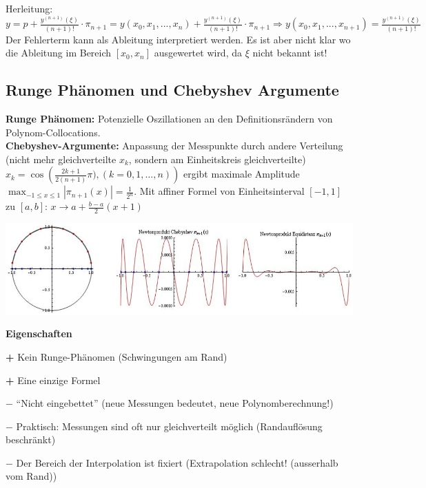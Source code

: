 Herleitung: $y = p + \frac{y^{(n+1)}(\xi)}{(n+1)!} \cdot \pi_{n+1} = y(x_0,x_1,...,x_n) + \frac{y^{(n+1)}(\xi)}{(n+1)!} \cdot \pi_{n+1} \Longrightarrow y(x_0,x_1,...,x_{n+1}) = \frac{y^{(n+1)}(\xi)}{(n+1)!}$\\

Der Fehlerterm kann als Ableitung interpretiert werden. Es ist aber nicht klar wo die Ableitung im Bereich $[x_0,x_n]$ ausgewertet wird, da $\xi$ nicht bekannt ist!

\subsection{Runge Phänomen und Chebyshev Argumente}
\textbf{Runge Phänomen:} Potenzielle Oszillationen an den Definitionsrändern von Polynom-Collocations.\\
\textbf{Chebyshev-Argumente:} Anpassung der Messpunkte durch andere Verteilung (nicht mehr gleichverteilte $x_k$, sondern am Einheitskreis gleichverteilte)
$x_k = \cos({\frac{2k+1}{2(n+1)}\pi), (k=0,1,\ldots,n)})$
ergibt maximale Amplitude $\max_{-1\leq x\leq 1}|\pi_{n+1}(x)| = \frac{1}{2^n}$. Mit affiner Formel von Einheitsinterval $[-1,1]$ zu $[a,b]$: $x \rightarrow a+\frac{b-a}{2}(x+1)$
\begin{center}
\includegraphics[width=14cm]{bilder/TschbyNewtonVergleich.png}
\end{center}

\textbf{Eigenschaften}
\begin{liste}
  \item[\textbf{+}] Kein Runge-Phänomen (Schwingungen am Rand)
  \item[\textbf{+}] Eine einzige Formel
  \item[$\mathbf{-}$] "`Nicht eingebettet"' (neue Messungen bedeutet, neue Polynomberechnung!)
  \item[$\mathbf{-}$] Praktisch: Messungen sind oft nur gleichverteilt möglich (Randauflösung beschränkt)
  \item[$\mathbf{-}$] Der Bereich der Interpolation ist fixiert (Extrapolation schlecht! (ausserhalb vom Rand))
\end{liste}


